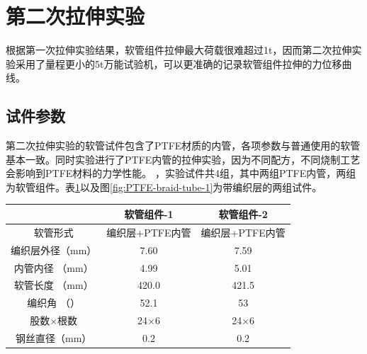 \begin{figure}[!htb]
	\label{fig:experiment-1-fail}
\end{figure}









\section{第二次拉伸实验}

根据第一次拉伸实验结果，软管组件拉伸最大荷载很难超过1t，因而第二次拉伸实验采用了量程更小的5t万能试验机，可以更准确的记录软管组件拉伸的力位移曲线。

\subsection{试件参数}
第二次拉伸实验的软管试件包含了PTFE材质的内管，各项参数与普通使用的软管基本一致。同时实验进行了PTFE内管的拉伸实验，因为不同配方，不同烧制工艺会影响到PTFE材料的力学性能。
 ，实验试件共4组，其中两组PTFE内管，两组为软管组件。表\ref{tab:hose-specimen-II}以及图\ref{fig:PTFE-braid-tube-1}为带编织层的两组试件。
\begin{table}[!htb]
	\centering
	\label{tab:hose-specimen-II}
	\begin{tabular*}{0.8\textwidth}{@{\extracolsep{\fill}}>{\hspace{0.5cm}}ccc}
		\toprule
		&     软管组件-1     &     软管组件-2     \\ \midrule
		软管形式& 编织层+PTFE内管&编织层+PTFE内管\\
		编织层外径（mm）            &     7.60      &     7.59      \\
		内管内径 （mm）           &     4.99      &     5.01      \\
		软管长度 （mm）           &     420.0     &     421.5     \\
		编织角 （\textdegree） &     52.1      &     53      \\
		股数$ \times $根数    & 24$ \times $6 & 24$ \times $6 \\
		钢丝直径（mm）          &      0.2      &      0.2      \\ \bottomrule
	\end{tabular*} 
\end{table}


